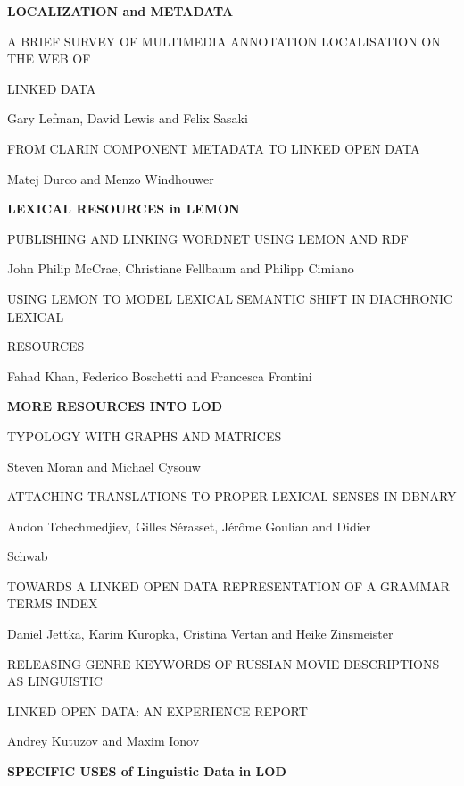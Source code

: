 \documentclass{article}
\begin{document}
\vspace{24pt}
\textbf{LOCALIZATION and METADATA}

\vspace{12pt}
A BRIEF SURVEY OF MULTIMEDIA ANNOTATION LOCALISATION ON THE WEB OF

LINKED DATA

Gary Lefman, David Lewis and Felix Sasaki

\vspace{12pt}
FROM CLARIN COMPONENT METADATA TO LINKED OPEN DATA

Matej Durco and Menzo Windhouwer

\vspace{24pt}
\textbf{LEXICAL RESOURCES in LEMON}

\vspace{12pt}
PUBLISHING AND LINKING WORDNET USING LEMON AND RDF

John Philip McCrae, Christiane Fellbaum and Philipp Cimiano

\vspace{12pt}
USING LEMON TO MODEL LEXICAL SEMANTIC SHIFT IN DIACHRONIC LEXICAL

RESOURCES

Fahad Khan, Federico Boschetti and Francesca Frontini

\vspace{12pt}
\textbf{MORE RESOURCES INTO LOD}

\vspace{12pt}
TYPOLOGY WITH GRAPHS AND MATRICES

Steven Moran and Michael Cysouw

\vspace{12pt}
ATTACHING TRANSLATIONS TO PROPER LEXICAL SENSES IN DBNARY

Andon Tchechmedjiev, Gilles Sérasset, Jérôme Goulian and Didier

Schwab

\vspace{12pt}
TOWARDS A LINKED OPEN DATA REPRESENTATION OF A GRAMMAR TERMS INDEX

Daniel Jettka, Karim Kuropka, Cristina Vertan and Heike Zinsmeister

\vspace{12pt}
RELEASING GENRE KEYWORDS OF RUSSIAN MOVIE DESCRIPTIONS AS LINGUISTIC

LINKED OPEN DATA: AN EXPERIENCE REPORT

Andrey Kutuzov and Maxim Ionov

\vspace{12pt}
\textbf{SPECIFIC USES of Linguistic Data in LOD}
\end{document}
